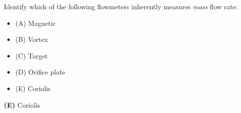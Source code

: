 

Identify which of the following flowmeters inherently measures {\it mass} flow rate:

\begin{itemize}
\item{(A)} Magnetic
\vskip 5pt 
\item{(B)} Vortex
\vskip 5pt 
\item{(C)} Target
\vskip 5pt 
\item{(D)} Orifice plate
\vskip 5pt 
\item{(E)} Coriolis
\end{itemize}







{\bf (E)} Coriolis
 









